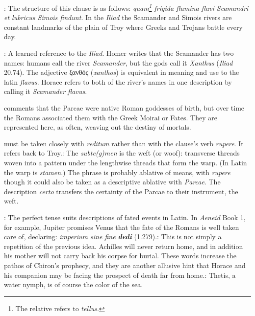 
: The structure of this clause is as follows: \textit{quam\footnote{The relative refers to \textit{tellus}.} frigida flumina flavi Scamandri et lubricus Simois findunt.}  In the \textit{Iliad} the Scamander and Simois rivers are constant landmarks of the plain of Troy where Greeks and Trojans battle every day.


: A learned reference to the \textit{Iliad}.  Homer writes that the Scamander has two names: humans call the river \textit{Scamander}, but the gods call it \textit{Xanthus} (\textit{Iliad} 20.74).  The adjective ξανθός (\textit{xanthos}) is equivalent in meaning and use to the latin \textit{flavus}.  Horace refers to both of the river's names in one description by calling it \textit{Scamander flavus}.


\citet[224--225]{mankin1995} comments that the Parcae were native Roman goddesses of birth, but over time the Romans associated them with the Greek Moirai or Fates.  They are represented here, as often, weaving out the destiny of mortals.


 must be taken closely with \textit{reditum} rather than with the clause's verb \textit{rupere}.  It refers back to Troy.\indent{}: The \textit{subte(g)men} is the weft (or woof): transverse threads woven into a pattern under the lengthwise threads that form the warp.  (In Latin the warp is \textit{stāmen}.)  The phrase is probably ablative of means, with \textit{rupere} though it could also be taken as a descriptive ablative with \textit{Parcae}.  The description \textit{certo} transfers the certainty of the Parcae to their instrument, the weft.


: The perfect tense suits descriptions of fated events in Latin.  In \textit{Aeneid} Book 1, for example, Jupiter promises Venus that the fate of the Romans is well taken care of, declaring: \textit{imperium sine fine \textbf{dedi}} (1.279).\indent{}: This is not simply a repetition of the previous idea.  Achilles will never return home, and in addition his mother will not carry back his corpse for burial.  These words increase the pathos of Chiron's prophecy, and they are another allusive hint that Horace and his companion may be facing the prospect of death far from home.\indent{}: Thetis, a water nymph, is of course the color of the sea.

